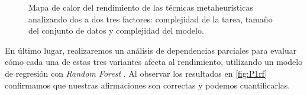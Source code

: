 \begin{figure}[!tbp]
    \centering
    \hfill
    \hfill
    \caption{Mapa de calor del rendimiento de las técnicas metaheurísticas analizando dos a dos tres factores: complejidad de la tarea, tamaño del conjunto de datos y complejidad del modelo.}
    \label{fig:hmP1}
\end{figure}


En último lugar, realizaremos un análisis de dependencias parciales para evaluar cómo cada una de estas tres variantes afecta al rendimiento, utilizando un modelo de regresión con \textit{Random Forest} \cite{randomforest}. Al observar los resultados en \ref{fig:P1rf} confirmamos que nuestras afirmaciones son correctas y podemos cuantificarlas.

